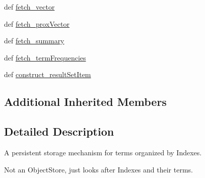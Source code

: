 \begin{DoxyCompactItemize}
def \hyperlink{classcheshire3_1_1base_objects_1_1_index_store_ad2309bb2a85e1454b661c1178aa134e2}{fetch\-\_\-vector}
\item 
def \hyperlink{classcheshire3_1_1base_objects_1_1_index_store_a7c2aaf64cdba6109a7badd401e41c6ae}{fetch\-\_\-prox\-Vector}
\item 
def \hyperlink{classcheshire3_1_1base_objects_1_1_index_store_abeb97ae0d965f47173d683b4d18c72df}{fetch\-\_\-summary}
\item 
def \hyperlink{classcheshire3_1_1base_objects_1_1_index_store_a5c03542db4b2eb3173c7ca1cc7b81ced}{fetch\-\_\-term\-Frequencies}
\item 
def \hyperlink{classcheshire3_1_1base_objects_1_1_index_store_a644b6bfaea12956669b5b613789bea21}{construct\-\_\-result\-Set\-Item}
\end{DoxyCompactItemize}
\subsection*{Additional Inherited Members}


\subsection{Detailed Description}
\begin{DoxyVerb}A persistent storage mechanism for terms organized by Indexes.

Not an ObjectStore, just looks after Indexes and their terms.
\end{DoxyVerb}
 

